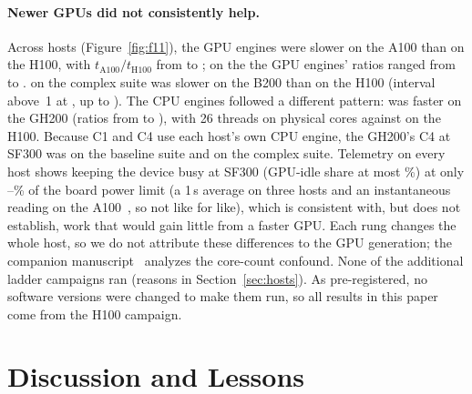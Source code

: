 \documentclass[sigconf, nonacm]{acmart}
\begin{document}
\paragraph{Newer GPUs did not consistently help.} Across hosts
(Figure~\ref{fig:f11}),
\ifaonehundredran
the GPU engines were slower on the A100 than on the H100, with
$t_{\mathrm{A100}}/t_{\mathrm{H100}}$ from  to
;
\fi
on the  the GPU engines' ratios ranged from
 to .
\ifbtwohundredran
\polarsgpu{} on the complex suite was slower on the B200 than on the H100
(interval above~1 at , up to
).
\fi
The CPU engines followed a different pattern:
\ifghtwohundredran
\polarscpu{} was faster on the GH200 (ratios from
 to ),
with 26 threads on  physical cores
against  on the H100. Because C1 and C4 use each
host's own CPU engine, the GH200's C4 at SF300 was
 on the baseline suite and
 on the complex suite.
\fi
Telemetry on every host shows \polarsgpu{} keeping the device busy at SF300
(GPU-idle share at most \%) at
only --\%
of the board power limit (a 1\,s average on three hosts and an instantaneous
reading on the A100~\citep{nvml_api}, so not like for like), which is consistent
with, but does not establish, work
that would gain little from a faster GPU. Each rung changes the whole host, so
we do not attribute these differences to the GPU generation; the companion
manuscript~\citep{ejiofor2026lockin} analyzes the core-count confound.
\fi
\ifladderran\else
None of the additional ladder campaigns ran (reasons in
Section~\ref{sec:hosts}). As pre-registered, no software versions were changed
to make them run, so all results in this paper come from the H100 campaign.
\fi

\section{Discussion and Lessons}
\label{sec:discussion}
\end{document}
